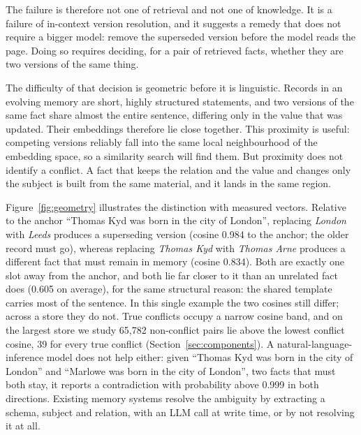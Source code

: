 \documentclass[journal=jcisd8,manuscript=article]{achemso}
\begin{document}
The failure is therefore not one of retrieval and not one of knowledge. It is a failure of in-context version resolution, and it suggests a remedy that does not require a bigger model: remove the superseded version before the model reads the page. Doing so requires deciding, for a pair of retrieved facts, whether they are two versions of the same thing.

The difficulty of that decision is geometric before it is linguistic. Records in an evolving memory are short, highly structured statements, and two versions of the same fact share almost the entire sentence, differing only in the value that was updated. Their embeddings therefore lie close together. This proximity is useful: competing versions reliably fall into the same local neighbourhood of the embedding space, so a similarity search will find them. But proximity does not identify a conflict. A fact that keeps the relation and the value and changes only the subject is built from the same material, and it lands in the same region.

Figure~\ref{fig:geometry} illustrates the distinction with measured vectors. Relative to the anchor ``Thomas Kyd was born in the city of London'', replacing \emph{London} with \emph{Leeds} produces a superseding version (cosine 0.984 to the anchor; the older record must go), whereas replacing \emph{Thomas Kyd} with \emph{Thomas Arne} produces a different fact that must remain in memory (cosine 0.834). Both are exactly one slot away from the anchor, and both lie far closer to it than an unrelated fact does (0.605 on average), for the same structural reason: the shared template carries most of the sentence. In this single example the two cosines still differ; across a store they do not. True conflicts occupy a narrow cosine band, and on the largest store we study 65,782 non-conflict pairs lie above the lowest conflict cosine, 39 for every true conflict (Section~\ref{sec:components}). A natural-language-inference model does not help either: given ``Thomas Kyd was born in the city of London'' and ``Marlowe was born in the city of London'', two facts that must both stay, it reports a contradiction with probability above 0.999 in both directions. Existing memory systems resolve the ambiguity by extracting a schema, subject and relation, with an LLM call at write time, or by not resolving it at all.
\end{document}
